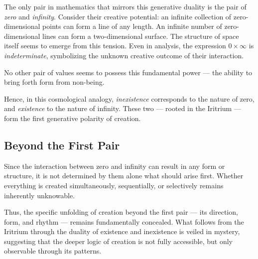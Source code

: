 The only pair in mathematics that mirrors this generative duality is the pair of \emph{zero} and \emph{infinity}. Consider their creative potential: an infinite collection of zero-dimensional points can form a line of any length. An infinite number of zero-dimensional lines can form a two-dimensional surface. The structure of space itself seems to emerge from this tension. Even in analysis, the expression $0 \times \infty$ is \emph{indeterminate}, symbolizing the unknown creative outcome of their interaction.

No other pair of values seems to possess this fundamental power — the ability to bring forth form from non-being.

Hence, in this cosmological analogy, \emph{inexistence} corresponds to the nature of zero, and \emph{existence} to the nature of infinity. These two — rooted in the Iritrium — form the first generative polarity of creation.

\subsection{Beyond the First Pair}

Since the interaction between zero and infinity can result in any form or structure, it is not determined by them alone what should arise first. Whether everything is created simultaneously, sequentially, or selectively remains inherently unknowable.

Thus, the specific unfolding of creation beyond the first pair — its direction, form, and rhythm — remains fundamentally concealed. What follows from the Iritrium through the duality of existence and inexistence is veiled in mystery, suggesting that the deeper logic of creation is not fully accessible, but only observable through its patterns.

